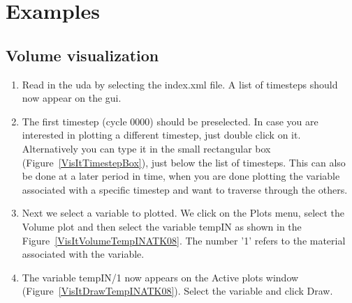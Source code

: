 \section{Examples}

\subsection{Volume visualization}

\begin{enumerate}

\item Read in the uda by selecting the index.xml file. A list of
  timesteps should now appear on the gui.



\item The first timestep (cycle 0000) should be preselected. In case you
are interested in plotting a different timestep, just double click on
it. Alternatively you can type it in the small rectangular box
(Figure~\ref{VisItTimestepBox}), just below the list of
timesteps. This can also be done at a later period in time, when you
are done plotting the variable associated with a specific timestep and
want to traverse through the others.


\item Next we select a variable to plotted. We click on the Plots
  menu, select the Volume plot and then select the variable tempIN as
  shown in the Figure~\ref{VisItVolumeTempINATK08}. The number '1'
  refers to the material associated with the variable.


\item The variable tempIN/1 now appears on the Active plots window
  (Figure~\ref{VisItDrawTempINATK08}). Select the variable and click
  Draw.


\end{enumerate}
